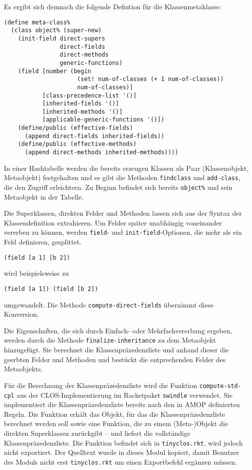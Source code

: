 Es ergibt sich demnach die folgende Defintion für die Klassenmetaklasse:

\begin{lstlisting}
(define meta-class%
  (class object% (super-new)
    (init-field direct-supers
                direct-fields
                direct-methods
                generic-functions)
    (field [number (begin 
                     (set! num-of-classes (+ 1 num-of-classes))
                     num-of-classes)]
           [class-precedence-list '()]
           [inherited-fields '()]
           [inherited-methods '()]
           [applicable-generic-functions '()])    
    (define/public (effective-fields)
      (append direct-fields inherited-fields))
    (define/public (effective-methods)
      (append direct-methods inherited-methods))))
\end{lstlisting}

In einer Hashtabelle werden die bereits erzeugen Klassen als Paar (Klassenobjekt, Metaobjekt) festgehalten und es gibt die Methoden \texttt{findclass} und \texttt{add-class}, die den Zugriff erleichtern. Zu Beginn befindet sich bereits \texttt{object\%} und sein Metaobjekt in der Tabelle.

Die Superklassen, direkten Felder und Methoden lassen sich aus der Syntax der Klassendefinition extrahieren. Um Felder später unabhängig voneinander vererben zu können, werden \texttt{field}- und \texttt{init-field}-Optionen, die mehr als ein Feld definieren, gesplittet. 

\texttt{(field [a 1] [b 2])}

wird beispielsweise zu

\texttt{(field [a 1]) (field [b 2])}

umgewandelt. Die Methode \texttt{compute-direct-fields} übernimmt diese Konversion.

Die Eigenschaften, die sich durch Einfach- oder Mehrfachvererbung ergeben, werden durch die Methode \texttt{finalize-inheritance} zu dem Metaobjekt hinzugefügt. Sie berechnet die Klassenpräzedenzliste und anhand dieser die geerbten Felder und Methoden und bestückt die entprechenden Felder des Metaobjekts.

Für die Berechnung der Klassenpräzedenzliste wird die Funktion \texttt{compute-std-cpl} aus der CLOS-Implementierung im Racketpaket \texttt{swindle} verwendet. Sie implementiert die Klassenpräzedenzliste bereits nach den in AMOP definierten Regeln. Die Funktion erhält das Objekt, für das die Klassenpräzedenzliste berechnet werden soll  sowie eine Funktion, die zu einem (Meta-)Objekt die direkten Superklassen zurückgibt -- und liefert die vollständige Klassenpräzedenzliste. Die Funktion befindet sich in \texttt{tinyclos.rkt}, wird jedoch nicht exportiert. Der Quelltext wurde in dieses Modul kopiert, damit Benutzer des Moduls nicht erst \texttt{tinyclos.rkt} um einen Exportbefehl ergänzen müssen. 

